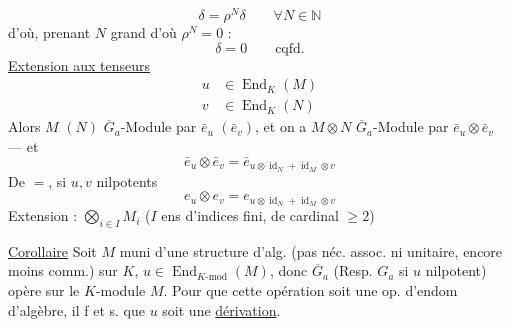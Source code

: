 \[
\delta=\rho^N\delta\qquad\forall N\in\mathbb{N}
\]
d'où, prenant $N$ grand d'où $\rho^N=0$ :
\[
\delta=0\qquad\text{cqfd.}
\]
\uline{Extension aux tenseurs}
\[
\begin{aligned}
u&\in\operatorname{End}_K(M)\\
v&\in\operatorname{End}_K(N)
\end{aligned}
\]
Alors $M$ $(N)$ $\overline G_a$-Module par $\bar e_u$ $(\bar e_v)$, et on a $M\otimes N$ $\overline G_a$-Module par $\bar e_u\otimes\bar e_v$ --- et
\[
\bar e_u\otimes\bar e_v=\bar e_{u\otimes\operatorname{id}_N+\operatorname{id}_M\otimes v}
\]
De $=$, si $u,v$ nilpotents
\[
e_u\otimes e_v=e_{u\otimes\operatorname{id}_N+\operatorname{id}_M\otimes v}
\]
Extension : $\displaystyle\bigotimes_{i\in I}M_i$ ($I$ ens d'indices fini, de cardinal $\geq2$)

\uline{Corollaire} Soit $M$ muni d'une structure d'alg. (pas néc. assoc. ni unitaire, encore moins comm.) sur $K$, $u\in\operatorname{End}_{K\text{-mod}}(M)$, donc $\overline G_a$ (Resp. $G_a$ si $u$ nilpotent) opère sur le $K$-module $M$. Pour que cette opération soit une op. d'endom d'algèbre, il f et s. que $u$ soit une \uline{dérivation}.
